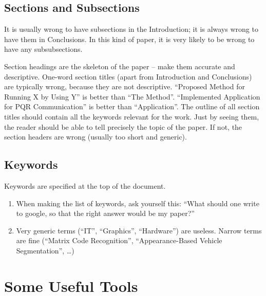 \documentclass{ExcelAtFIT}
\begin{document}
\subsection{Sections and Subsections}
\label{sec:Sections}

It is usually wrong to have subsections in the Introduction; it is always wrong to have them in Conclusions.  In this kind of paper, it is very likely to be wrong to have any subsubsections.

Section headings are the skeleton of the paper -- make them accurate and descriptive.  One-word section titles (apart from Introduction and Conclusions) are typically wrong, because they are not descriptive.
``Proposed Method for Running X by Using Y'' is better than ``The Method''.
``Implemented Application for PQR Communication'' is better than ``Application''.  The outline of all section titles should contain all the keywords relevant for the work.  Just by seeing them, the reader should be able to tell precisely the topic of the paper.  If not, the section headers are wrong (usually too short and generic).

\subsection{Keywords}
\label{sec:Keywords}

Keywords are specified at the top of the document.
\begin{enumerate}[noitemsep]
	\item When making the list of keywords, ask yourself this: ``What should one write to google, so that the right answer would be my paper?''
	\item Very generic terms (``IT'', ``Graphics'', ``Hardware'') are useless. Narrow terms are fine (``Matrix Code Recognition'', ``Appearance-Based Vehicle Segmentation'', \ldots)
\end{enumerate}

\section{Some Useful Tools}
\label{sec:UsefulTools}
\end{document}
